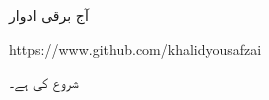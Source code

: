 آج برقی ادوار

{
\begin{otherlanguage}{english}
https:/\!\!/www.github.com/khalidyousafzai
\end{otherlanguage}
}

شروع کی ہے۔
\vspace{5mm}

{}


